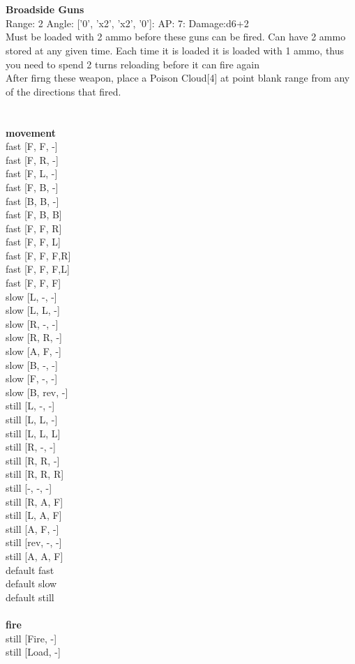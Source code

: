 \ \\

\ \\
{\bf Broadside Guns } \\



Range: 2  Angle: ['0', 'x2', 'x2', '0']: AP: 7: Damage:d6+2 \\
Must be loaded with 2 ammo before these guns can be fired. Can have 2 ammo stored at any given time. Each time it is loaded it is loaded with 1 ammo, thus you need to spend 2 turns reloading before it can fire again\\ 
After firng these weapon, place a Poison Cloud[4] at point blank range from any of the directions that fired.\\ 




 
\ \\



\ \\ {\bf movement } \\
fast [F, F, -] \\
fast [F, R, -] \\
fast [F, L, -] \\
fast [F, B, -] \\
fast [B, B, -] \\
fast [F, B, B] \\
fast [F, F, R] \\
fast [F, F, L] \\
fast [F, F, F,R] \\
fast [F, F, F,L] \\
fast [F, F, F] \\
slow [L, -, -] \\
slow [L, L, -] \\
slow [R, -, -] \\
slow [R, R, -] \\
slow [A, F, -] \\
slow [B, -, -] \\
slow [F, -, -] \\
slow [B, rev, -] \\
still [L, -, -] \\
still [L, L, -] \\
still [L, L, L] \\
still [R, -, -] \\
still [R, R, -] \\
still [R, R, R] \\
still [-, -, -] \\
still [R, A, F] \\
still [L, A, F] \\
still [A, F, -] \\
still [rev, -, -] \\
still [A, A, F] \\
default fast \\
default slow \\
default still \\
\ \\ {\bf fire } \\
still [Fire, -] \\
still [Load, -] \\


